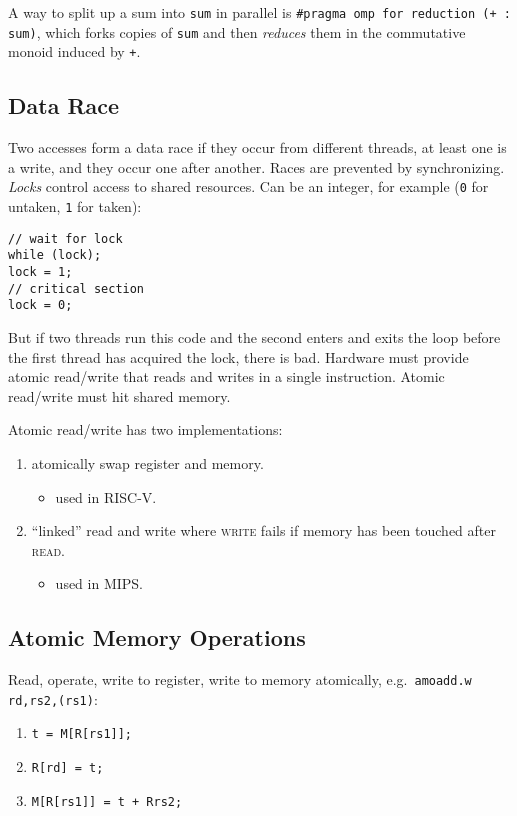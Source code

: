 A way to split up a sum into \texttt{sum} in parallel is \texttt{\#pragma omp for reduction (+ : sum)}, which forks copies of \texttt{sum} and then \emph{reduces} them in the commutative monoid induced by \texttt{+}.

\subsection{Data Race}
Two accesses form a data race if they occur from different threads, at least one is a write, and they occur one after another. Races are prevented by synchronizing.
\emph{Locks} control access to shared resources. Can be an integer, for example (\texttt{0} for untaken, \texttt{1} for taken):
\begin{verbatim}
// wait for lock
while (lock);
lock = 1;
// critical section
lock = 0;
\end{verbatim}
But if two threads run this code and the second enters and exits the loop before the first thread has acquired the lock, there is bad. Hardware must provide atomic read/write that reads and writes in a single instruction. Atomic read/write must hit shared memory.

Atomic read/write has two implementations:
\begin{enumerate}
	\item atomically swap register and memory.
	\begin{itemize}
		\item used in RISC-V.
	\end{itemize}
	\item ``linked'' read and write where \textsc{write} fails if memory has been touched after \textsc{read}.
	\begin{itemize}
		\item used in MIPS.
	\end{itemize}
\end{enumerate}

\subsection{Atomic Memory Operations}
Read, operate, write to register, write to memory atomically, e.g.~\texttt{amoadd.w rd,rs2,(rs1)}:
\begin{enumerate}
	\item \texttt{t = M[R[rs1]];}
	\item \texttt{R[rd] = t;}
	\item \texttt{M[R[rs1]] = t + R{rs2};}
\end{enumerate}


